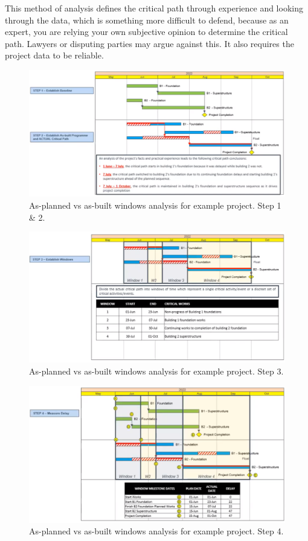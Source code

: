 This method of analysis defines the critical path through experience and looking through the data, which is something more difficult to defend, because as an expert, you are relying your own subjective opinion to determine the critical path. Lawyers or disputing parties may argue against this. It also requires the project data to be reliable.
\begin{figure}[H]
    \centering
    \includegraphics[width = \textwidth]{img/figure37.png}
    \caption{As-planned vs as-built windows analysis for example project. Step 1 \& 2.}
\end{figure}
\begin{figure}[H]
    \centering
    \includegraphics[width = \textwidth]{img/figure38.png}
    \caption{As-planned vs as-built windows analysis for example project. Step 3.}
\end{figure}
\begin{figure}[H]
    \centering
    \includegraphics[width = \textwidth]{img/figure39.png}
    \caption{As-planned vs as-built windows analysis for example project. Step 4.}
\end{figure}
